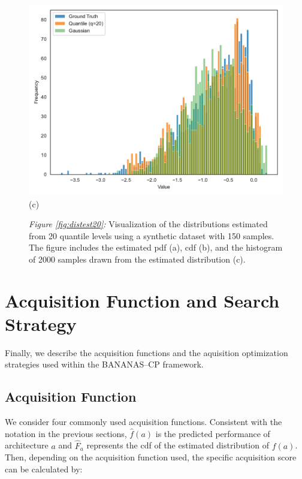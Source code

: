 \begin{landscape}
\begin{figure}[H]
  \hfill
   \begin{minipage}[b]{0.4\textwidth}
    \centering
    \includegraphics[width=\linewidth]{figs/20_rvs_plot.pdf}
    \\[0.5em]
    {\small (c)}
  \end{minipage}
  \vspace{1em}
  
 \parbox{\linewidth}{
 	 {\small \textit{Figure \ref{fig:distest20}:} Visualization of the distributions estimated from 20 quantile levels using a synthetic dataset with 150 samples. The figure includes the estimated \gls{pdf} (a), \gls{cdf} (b), and the histogram of 2000 samples drawn from the estimated distribution (c).}
 }
\end{figure}
\end{landscape}

\vspace{1em}
\section{Acquisition Function and Search Strategy}
\label{sec:acq}
Finally, we describe the acquisition functions and the aquisition optimization strategies used within the BANANAS--CP framework.

\vspace{0.1em}
\subsection{Acquisition Function}
\label{subsec:acq_func}
We consider four commonly used acquisition functions. Consistent with the notation in the previous sections, $\hat{f}(a)$ is the predicted performance of architecture $a$ and $\hat{F}_a$ represents the \gls{cdf} of the estimated distribution of $f(a)$. Then, depending on the acquisition function used, the specific acquisition score can be calculated by: 

